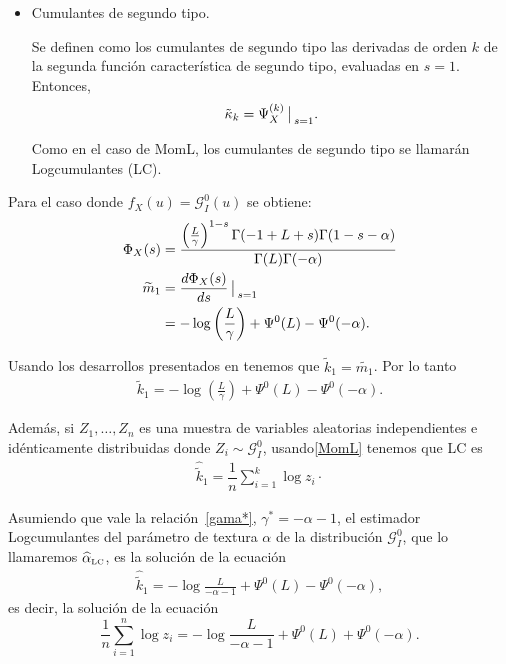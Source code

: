 \begin{itemize}
\item Cumulantes de segundo tipo.

	  Se definen como los cumulantes de segundo tipo las derivadas de orden $k$ de la segunda función característica de segundo tipo, evaluadas en $s=1$. Entonces,
	  \begin{align}
	  \label{CumulanteSegundoTipo}
	  \tilde{\kappa}_k=\Psi_X^{(k)}\big\arrowvert _{s=1}.
	  \end{align}
	  
Como en el caso de MomL, los cumulantes de segundo tipo se llamarán Logcumulantes (LC).
\end{itemize}

Para el caso donde $f_X(u) = \mathcal{G}_I^0(u)$ se obtiene:
	\begin{align}
	\Phi_X(s) &= \dfrac{\left(\frac{L}{\gamma}\right)^{1-s}\Gamma(-1+L+s)\Gamma(1-s-\alpha)}{\Gamma(L)\Gamma(-\alpha)} \\
	\vspace{1cm}
	\nonumber \widetilde{m}_1 &=  \frac{d \Phi_X(s)}{ds } \big\arrowvert _{s=1}\\
					& = -\log\left(\frac{L}{\gamma}\right) + \Psi^0(L) - \Psi^0(-\alpha).
	\end{align}

Usando los desarrollos presentados en \citet{Tison2004} tenemos que $\widetilde{k}_1 = \widetilde{m_1}$. Por lo tanto 
\begin{align}
\label{MomLC}
\widetilde{k}_1 =   -\log \left(\frac{L}{\gamma}\right) + \Psi^0(L) - \Psi^0(-\alpha).
\end{align}

Además, si $Z_1,\ldots,Z_n$ es una muestra de variables aleatorias independientes e idénticamente distribuidas donde $Z_i \sim \mathcal{G}_I^0$, usando\eqref{MomL} tenemos que LC es
\begin{align}
\label{EstimadorMomLC}
\widehat{\widetilde{k}}_1 =\dfrac{1}{n} \sum_{i=1}^k\log z_i\cdot
\end{align}

Asumiendo que vale la relación~\eqref{gama*}, $\gamma^*=-\alpha-1$, el estimador Logcumulantes del parámetro de textura $\alpha$ de la distribución $\mathcal{G}_I^0$, que lo llamaremos $\widehat\alpha_{\text{\tiny{LC}}}$, es la solución de la ecuación    
\begin{align}
\widehat{\widetilde{k}}_1 =   -\log \frac{L}{-\alpha-1} + \Psi^0(L) - \Psi^0(-\alpha),
\end{align}
es decir, la solución de la ecuación
\begin{equation} \label{eq:logm}
\frac{1}{n} \sum_{i=1}^n\log z_i =   -\log \frac{L}{-\alpha-1} + \Psi^0(L) + \Psi^0(-\alpha).
\end{equation}


